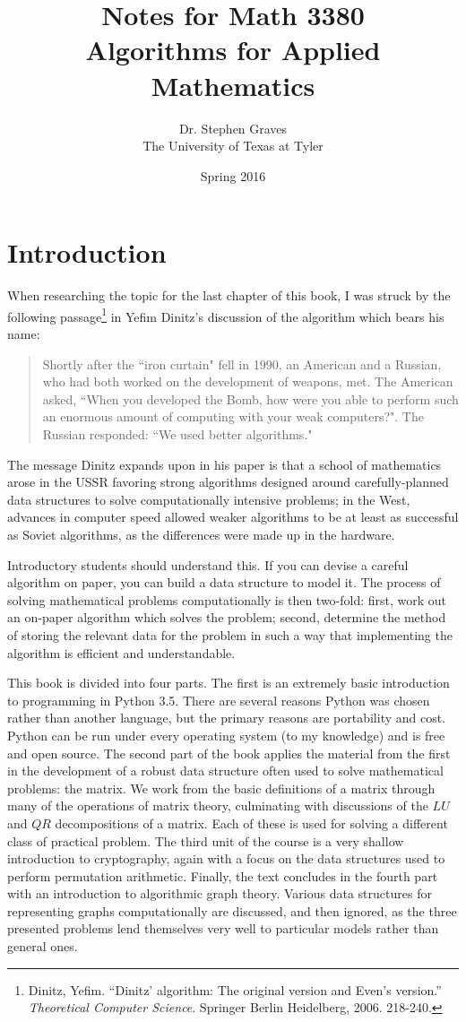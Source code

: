 \documentclass[openright]{memoir}
\title{Notes for Math 3380\\\textbf{Algorithms for Applied Mathematics}}
\author{Dr. Stephen Graves\\The University of Texas at Tyler}
\date{Spring 2016}
\theoremstyle{plain}
\theoremstyle{definition}
\theoremstyle{remark}
\begin{document}
\frontmatter
\pagestyle{empty}
\maketitle
\clearpage
\section*{Introduction}
When researching the topic for the last chapter of this book, I was struck by the following passage\footnote{Dinitz, Yefim. ``Dinitz' algorithm: The original version and Even's version.'' \emph{Theoretical Computer Science}. Springer Berlin Heidelberg, 2006. 218-240.} in Yefim Dinitz's discussion of the algorithm which bears his name:
\begin{quotation}
Shortly after the ``iron curtain" fell in 1990, an American and a Russian, who had both worked on the development of weapons, met. The American asked, ``When you developed the Bomb, how were you able to perform such an enormous amount of computing with your weak computers?". The Russian responded: ``We used better algorithms."
\end{quotation}
The message Dinitz expands upon in his paper is that a school of mathematics arose in the USSR favoring strong algorithms designed around carefully-planned data structures to solve computationally intensive problems; in the West, advances in computer speed allowed weaker algorithms to be at least as successful as Soviet algorithms, as the differences were made up in the hardware.

Introductory students should understand this. If you can devise a careful algorithm on paper, you can build a data structure to model it. The process of solving mathematical problems computationally is then two-fold: first, work out an on-paper algorithm which solves the problem; second, determine the method of storing the relevant data for the problem in such a way that implementing the algorithm is efficient and understandable.

This book is divided into four parts. The first is an extremely basic introduction to programming in Python 3.5. There are several reasons Python was chosen rather than another language, but the primary reasons are portability and cost. Python can be run under every operating system (to my knowledge) and is free and open source. The second part of the book applies the material from the first in the development of a robust data structure often used to solve mathematical problems: the matrix. We work from the basic definitions of a matrix through many of the operations of matrix theory, culminating with discussions of the $LU$ and $QR$ decompositions of a matrix. Each of these is used for solving a different class of practical problem. The third unit of the course is a very shallow introduction to cryptography, again with a focus on the data structures used to perform permutation arithmetic. Finally, the text concludes in the fourth part with an introduction to algorithmic graph theory. Various data structures for representing graphs computationally are discussed, and then ignored, as the three presented problems lend themselves very well to particular models rather than general ones.
\end{document}
